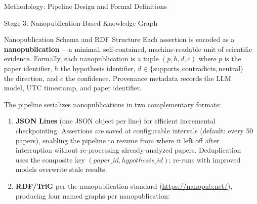 \documentclass[
  ignorenonframetext,
]{beamer}
\begin{document}
\begin{frame}[fragile]{Methodology: Pipeline Design and Formal
Definitions}
\begin{block}{Stage 3: Nanopublication-Based Knowledge Graph}
\begin{block}{Nanopublication Schema and RDF Structure}
\protect{}\label{nanopublication-schema-and-rdf-structure}
Each assertion is encoded as a \textbf{nanopublication}
\citep{groth2010anatomy, kuhn2016decentralized}---a minimal,
self-contained, machine-readable unit of scientific evidence. Formally,
each nanopublication is a tuple \((p, h, d, c)\) where \(p\) is the
paper identifier, \(h\) the hypothesis identifier,
\(d \in \{\text{supports}, \text{contradicts}, \text{neutral}\}\) the
direction, and \(c\) the confidence. Provenance metadata records the LLM
model, UTC timestamp, and paper identifier.

The pipeline serializes nanopublications in two complementary formats:

\begin{enumerate}
\item
  \textbf{JSON Lines} (one JSON object per line) for efficient
  incremental checkpointing. Assertions are saved at configurable
  intervals (default: every 50 papers), enabling the pipeline to resume
  from where it left off after interruption without re-processing
  already-analyzed papers. Deduplication uses the composite key
  \((paper\_id, hypothesis\_id)\); re-runs with improved models
  overwrite stale results.
\item
  \textbf{RDF/TriG} per the nanopublication standard
  (\url{https://nanopub.net/}), producing four named graphs per
  nanopublication:
\end{enumerate}


\end{block}
\end{block}
\end{frame}
\end{document}
